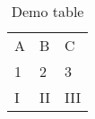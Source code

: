 \begin{table}[h]
\centering
\begin{tabular}{lll}
A & B  & C   \\
1 & 2  & 3   \\
I & II & III
\end{tabular}
\caption{Demo table}
\label{tab:my-table}
\end{table}